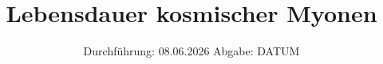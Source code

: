 

\subject{V01}
\title{Lebensdauer kosmischer Myonen}
\date{%
  Durchführung: 08.06.2026
  \hspace{3em}
  Abgabe: DATUM
}




\maketitle
\thispagestyle{empty}
\tableofcontents
\newpage








\printbibliography{}



